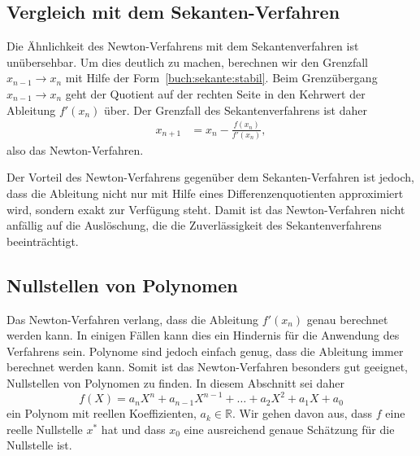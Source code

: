 %
%
\subsection{Vergleich mit dem Sekanten-Verfahren
\label{buch:subsection:newtonsekanten}}
Die Ähnlichkeit des Newton-Verfahrens mit dem Sekantenverfahren ist 
unübersehbar.
Um dies deutlich zu machen, berechnen wir den Grenzfall $x_{n-1}\to x_n$
mit Hilfe der Form~\eqref{buch:sekante:stabil}.
Beim Grenzübergang $x_{n-1}\to x_n$ geht der Quotient auf der rechten
Seite in den Kehrwert der Ableitung $f'(x_n)$ über.
Der Grenzfall des Sekantenverfahrens ist daher
\begin{align*}
x_{n+1}
&=
x_n -\frac{f(x_n)}{f'(x_n)},
\end{align*}
also das Newton-Verfahren.

Der Vorteil des Newton-Verfahrens gegenüber dem Sekanten-Verfahren ist
jedoch, dass die Ableitung nicht nur mit Hilfe eines Differenzenquotienten
approximiert wird, sondern exakt zur Verfügung steht.
Damit ist das Newton-Verfahren nicht anfällig auf die Auslöschung, die
die Zuverlässigkeit des Sekantenverfahrens beeinträchtigt.

%
%
\subsection{Nullstellen von Polynomen
\label{buch:subsection:polynomnullstellen}}
Das Newton-Verfahren verlang, dass die Ableitung $f'(x_n)$ genau
berechnet werden kann.
In einigen Fällen kann dies ein Hindernis für die Anwendung des
Verfahrens sein.
Polynome sind jedoch einfach genug, dass die Ableitung immer berechnet
werden kann.
Somit ist das Newton-Verfahren besonders gut geeignet, Nullstellen von
Polynomen zu finden.
In diesem Abschnitt sei daher
\begin{equation}
f(X) = a_nX^n + a_{n-1}X^{n-1} + \dots + a_2X^2 + a_1X + a_0
\label{buch:equation:nullstellenpolynom}
\end{equation}
ein Polynom mit reellen Koeffizienten, $a_k\in\mathbb R$.
Wir gehen davon aus, dass $f$ eine reelle Nullstelle $x^*$ hat
und dass $x_0$ eine ausreichend genaue Schätzung für die Nullstelle ist.

